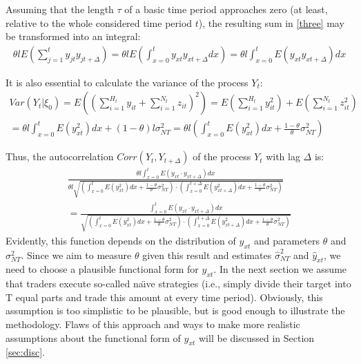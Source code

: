 \documentclass[12pt]{article}
\begin{document}
Assuming that the length $\tau$ of a basic time period approaches zero (at least, relative to the whole considered time period $t$), the resulting sum in \eqref{three} may be transformed into an integral:
\begin{equation} \label{four}
\begin{gathered}
\theta l E(\sum\limits_{j=1}^{t}y_{jt} y_{jt+\Delta})=
\theta l E(\int_{x=0}^{t}y_{xt} y_{xt+\Delta}dx)=\theta l \int_{x=0}^{t}E(y_{xt} y_{xt+\Delta})dx
\end{gathered}
\end{equation}

It is also essential to calculate the variance of the process $Y_t$:
\begin{equation} \label{var}
\begin{gathered}
Var(Y_t\vert\xi_0)=E((\sum\limits_{i=1}^{H_t}y_{it}+\sum\limits_{i=1}^{N_t}z_{it})^2)=
E(\sum\limits_{i=1}^{H_t}y_{it}^2)+E(\sum\limits_{i=1}^{N_t}z_{it}^2)\\
=\theta l\int_{x=0}^{t}E(y_{xt}^2)dx+(1-\theta) l\sigma^2_{NT}
=\theta l(\int_{x=0}^{t}E(y_{xt}^2)dx+\frac{1-\theta}{\theta}\sigma^2_{NT})
\end{gathered}
\end{equation}

Thus, the autocorrelation $Corr(Y_t,Y_{t+\Delta})$ of the process $Y_t$ with lag $\Delta$ is:
\begin{equation} \label{acor}
\begin{gathered}
\frac{\theta l \int_{x=0}^{t}E(y_{xt}\cdot y_{xt+\Delta})dx}
{\theta l\sqrt{(\int_{x=0}^{t}E(y_{xt}^2)dx+\frac{1-\theta}{\theta}\sigma^2_{NT})\cdot
(\int_{x=0}^{t+\Delta}E(y_{xt+\Delta}^2)dx+\frac{1-\theta}{\theta}\sigma^2_{NT})}}\\
=\frac{\int_{x=0}^{t}E(y_{xt}\cdot y_{xt+\Delta})dx}
{\sqrt{(\int_{x=0}^{t}E(y_{xt}^2)dx+\frac{1-\theta}{\theta}\sigma^2_{NT})\cdot
(\int_{x=0}^{t+\Delta}E(y_{xt+\Delta}^2)dx+\frac{1-\theta}{\theta}\sigma^2_{NT})}}
\end{gathered}
\end{equation}
Evidently, this function depends on the distribution of $y_{xt}$ and parameters $\theta$ and $\sigma^2_{NT}$. Since we aim to measure $\theta$ given this result and estimates $\hat{\sigma}^2_{NT}$ and $\hat{y}_{xt}$, we need to choose a plausible functional form for $y_{xt}$. In the next section we assume that traders execute so-called na\"{\i}ve strategies (i.e., simply divide their target into T equal parts and trade this amount at every time period). Obviously, this assumption is too simplistic to be plausible, but is good enough to illustrate the methodology. Flaws of this approach and ways to make more realistic assumptions about the functional form of $y_{xt}$ will be discussed in Section \ref{sec:disc}.
\newpage
\end{document}
